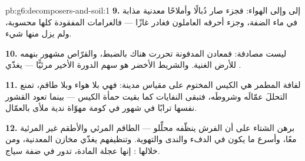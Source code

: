 \begin{solution}{pb:g6:decomposers-and-soil:1}
\textbf{9.} إلى  وإلى الهواء: فجزء صار دُبالًا وأملاحًا
معدنية مذابة في ماء  الضفة، وجزء أحرقه  العاملون
فغادر غازًا --- فالغرامات المفقودة كلها محسوبة، ولم يزل منها شيء.

\textbf{10.} ليست مصادفة: فمعادن  المدفونة تحررت هناك
بالضبط، والقرّاص مشهور بنهمه للأرض الغنية. والشريط الأخضر هو سهم
الدورة الأخير مرئيًّا ---  يغذّي .

\textbf{11.} لفافة المطمر هي الكيس المختوم على مقياس مدينة: فهي
بلا هواء وبلا طاقم، تمنع التحللَ عمّالَه وشروطَه، فتبقى النفايات
كما بقيت حمأة الكيس --- بينما تعود القشور نفسها ترابًا في شهور في
كومة مهوّاة ندية ملأى بالعمّال.

\textbf{12.} برهن الشتاء على أن الفرش ينظّفه محلِّلو  ---
الطاقم المرئي والأطقم غير المرئية معًا، وأسرع ما يكون في الدفء
والندى والتهوية. وتنظيفهم يغذّي مخازن  المعدنية، ومن خلالها
: إنها عجلة المادة، تدور في ضفة سياج.
\end{solution}
